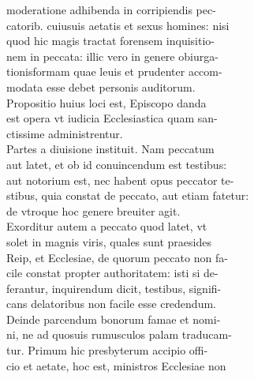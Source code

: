 \documentclass{article}
\begin{document}
\begin{pages}
                moderatione adhibenda in corripiendis pec- \\
                catorib. cuiusuis aetatis et sexus homines: nisi \\
                quod hic magis tractat forensem inquisitio- \\
                nem in peccata: illic vero in genere obiurga- \\
                tionisformam quae leuis et prudenter accom- \\
                modata esse debet personis auditorum. \\
                Propositio huius loci est, Episcopo danda \\
                est opera vt iudicia Ecclesiastica quam san- \\
                ctissime administrentur. \\
                Partes a diuisione instituit. Nam peccatum \\
                aut latet, et ob id conuincendum est testibus: \\
                aut notorium est, nec habent opus peccator te- \\
                stibus, quia constat de peccato, aut etiam fatetur: \\
                de vtroque hoc genere breuiter agit. \\
                Exorditur autem a peccato quod latet, vt \\
                solet in magnis viris, quales sunt praesides \\
                Reip, et Ecclesiae, de quorum peccato non fa- \\
                cile constat propter authoritatem: isti si de- \\
                ferantur, inquirendum dicit, testibus, signifi- \\
                cans delatoribus non facile esse credendum. \\
                Deinde parcendum bonorum famae et nomi- \\
                ni, ne ad quosuis rumusculos palam traducam- \\
                tur. Primum hic presbyterum accipio offi- \\
                cio et aetate, hoc est, ministros Ecclesiae non \\

\end{pages}
\end{document}
